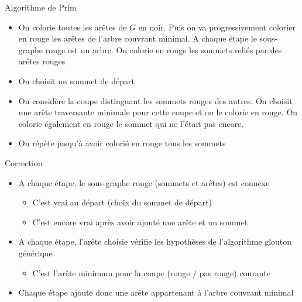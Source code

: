 \begin{frame}{Algorithme de Prim}
    \begin{itemize}
        \item On colorie toutes les arêtes de $G$ en noir. Puis on va progressivement colorier en rouge les arêtes de l'arbre couvrant minimal. A chaque étape le sous-graphe rouge est un arbre. On colorie en rouge les sommets reliés par des arêtes rouges
        \item On choisit un sommet de départ
        \item On considère la coupe distinguant  les sommets rouges des autres. On choisit une arête traversante minimale pour cette coupe et on le colorie en rouge. On colorie également en rouge le sommet qui ne l'était pas encore.
        \item On répète jusqu'à avoir colorié en rouge tous les sommets 
    \end{itemize}
\end{frame}

\begin{frame}{Correction}
\begin{itemize}
    \item A chaque étape, le sous-graphe rouge (sommets et arêtes) est connexe 
    \begin{itemize}
        \item C'est vrai au départ (choix du sommet de départ)
        \item C'est encore vrai après avoir ajouté une arête et un sommet 
    \end{itemize}
    \item A chaque étape, l'arête choisie vérifie les hypothèses de l'algorithme glouton générique 
    \begin{itemize}
        \item C'est l'arête minimum pour la coupe (rouge / pas rouge) courante 
    \end{itemize}
    \item Chaque étape ajoute donc une arête appartenant à l'arbre couvrant minimal 
\end{itemize}
\end{frame}


